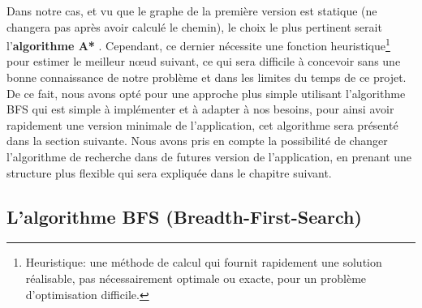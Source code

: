 Dans notre cas, et vu que le graphe de la première version est statique (ne changera pas après avoir calculé le chemin), le choix le plus pertinent serait l'\textbf{algorithme A*} \cite{Astar}.
Cependant, ce dernier nécessite une fonction heuristique\footnote{Heuristique: une méthode de calcul qui fournit rapidement une solution réalisable, pas nécessairement optimale ou exacte, pour un problème d'optimisation difficile.} pour estimer le meilleur nœud suivant, ce qui sera difficile à concevoir sans une bonne connaissance de notre problème et dans les limites du temps de ce projet.
De ce fait, nous avons opté pour une approche plus simple utilisant l'algorithme BFS qui est simple à implémenter et à adapter à nos besoins, pour ainsi avoir rapidement une version minimale de l'application, cet algorithme sera présenté dans la section suivante.\newline
Nous avons pris en compte la possibilité de changer l'algorithme de recherche dans de futures version de l'application, en prenant une structure plus flexible qui sera expliquée dans le chapitre suivant.

\subsection{L'algorithme BFS (Breadth-First-Search)}

